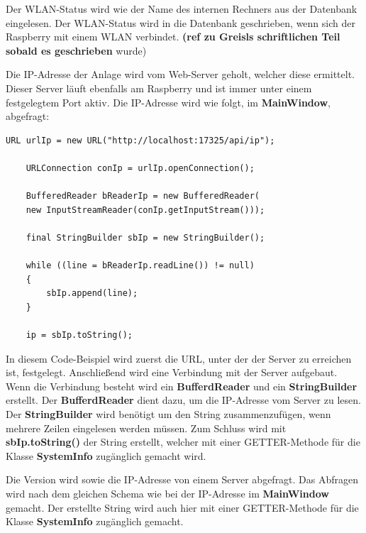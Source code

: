 Der WLAN-Status wird wie der Name des internen Rechners aus der Datenbank eingelesen. Der WLAN-Status wird in die Datenbank geschrieben, wenn sich der Raspberry mit einem WLAN verbindet. \textbf{(ref zu Greisls schriftlichen Teil sobald es geschrieben} wurde)

\vspace{10pt}

Die IP-Adresse der Anlage wird vom Web-Server geholt, welcher diese ermittelt. Dieser Server läuft ebenfalls am Raspberry und ist immer unter einem festgelegtem Port aktiv. Die \ac{IP}-Adresse wird wie folgt, im \textbf{MainWindow}, abgefragt:
\begin{lstlisting}[style=JavaStyle, caption=Abfragen der \ac{IP}-Adresse]
	URL urlIp = new URL("http://localhost:17325/api/ip");
	
	URLConnection conIp = urlIp.openConnection();
	
	BufferedReader bReaderIp = new BufferedReader(
	new InputStreamReader(conIp.getInputStream()));    
	
	final StringBuilder sbIp = new StringBuilder();
	
	while ((line = bReaderIp.readLine()) != null)
	{
		sbIp.append(line);
	}
            
	ip = sbIp.toString();    
\end{lstlisting}
In diesem Code-Beispiel wird zuerst die \ac{URL}, unter der der Server zu erreichen ist, festgelegt. Anschließend wird eine Verbindung mit der Server aufgebaut. Wenn die Verbindung besteht wird ein \textbf{BufferdReader} und ein \textbf{StringBuilder} erstellt. Der \textbf{BufferdReader} dient dazu, um die \ac{IP}-Adresse vom Server zu lesen. Der \textbf{StringBuilder} wird benötigt um den String zusammenzufügen, wenn mehrere Zeilen eingelesen werden müssen. Zum Schluss wird mit \textbf{sbIp.toString()} der String erstellt, welcher mit einer GETTER-Methode für die Klasse \textbf{SystemInfo} zugänglich gemacht wird.

\vspace{10pt}

Die Version wird sowie die \ac{IP}-Adresse von einem Server abgefragt. Das Abfragen wird nach dem gleichen Schema wie bei der \ac{IP}-Adresse im \textbf{MainWindow} gemacht. Der erstellte String wird auch hier mit einer GETTER-Methode für die Klasse \textbf{SystemInfo} zugänglich gemacht.


\newpage

